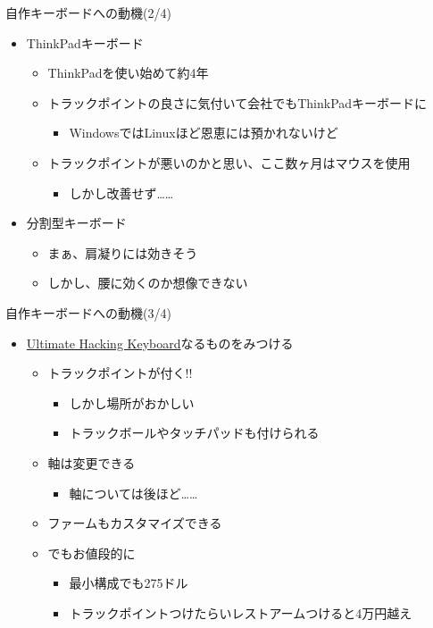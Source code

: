 \documentclass[cjk,dvipdfmx,10pt,compress,fragile%
hyperref={bookmarks=true,bookmarksnumbered=true,bookmarksopen=false,%
colorlinks=false,%
pdftitle={第 134 回 関西 Debian 勉強会},%
pdfauthor={小林},%
pdfsubject={資料},%
}]{beamer}
\begin{document}
\begin{frame}[fragile,t]{自作キーボードへの動機(2/4)}
 \begin{itemize}
  \item ThinkPadキーボード
	\begin{itemize}
	 \item ThinkPadを使い始めて約4年
	 \item トラックポイントの良さに気付いて会社でもThinkPadキーボードに
	       \begin{itemize}
		\item WindowsではLinuxほど恩恵には預かれないけど
	       \end{itemize}
	 \item トラックポイントが悪いのかと思い、ここ数ヶ月はマウスを使用
	       \begin{itemize}
		\item しかし改善せず……
	       \end{itemize}
	\end{itemize}
	\pause
  \item 分割型キーボード
	\begin{itemize}
	 \item まぁ、肩凝りには効きそう
	 \item しかし、腰に効くのか想像できない
	\end{itemize}
 \end{itemize}
\end{frame}

\begin{frame}[fragile,t]{自作キーボードへの動機(3/4)}
 \begin{itemize}
  \item \href{https://ultimatehackingkeyboard.com/}{Ultimate Hacking Keyboard}なるものをみつける
	\begin{itemize}
	 \item トラックポイントが付く!!
	       \begin{itemize}
		\item しかし場所がおかしい
		\item トラックボールやタッチパッドも付けられる
	       \end{itemize}
	 \item 軸は変更できる
	       \begin{itemize}
		\item 軸については後ほど……
	       \end{itemize}
	 \item ファームもカスタマイズできる
	 \item でもお値段的に
	       \begin{itemize}
		\item 最小構成でも275ドル
		\item トラックポイントつけたらいレストアームつけると4万円越え
	       \end{itemize}
	\end{itemize}
 \end{itemize}
\end{frame}
\end{document}
